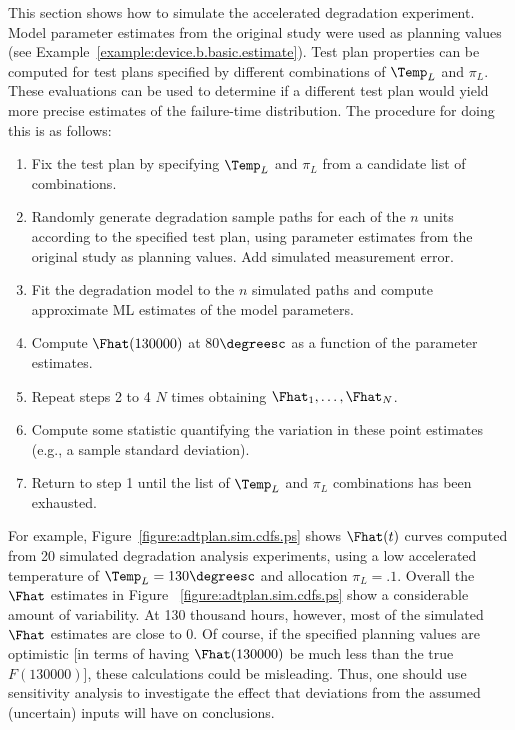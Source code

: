 This section shows how to simulate the accelerated degradation
experiment. Model parameter estimates from the original study were
used as planning values (see
Example~\ref{example:device.b.basic.estimate}). Test plan properties
can be computed for test plans specified by different combinations
of $\Temp_{L}$ and $\pi_{L}$.  These evaluations can be used to
determine if a different test plan would yield more precise
estimates of the failure-time distribution.  The procedure for doing
this is as follows:
%
\begin{enumerate}
\item Fix the test plan by specifying $\Temp_{L}$ and $\pi_{L}$
from a candidate list of combinations.
\item Randomly generate degradation sample paths for each of the $n$
units according to the specified test plan, using parameter estimates from
the original study as planning values. Add simulated measurement error.
\item Fit the degradation model to the $n$ simulated paths and compute
approximate ML estimates of the model parameters. 
\item Compute $\Fhat(130000)$ at 80$\degreesc$ as a function of the
parameter estimates. 
\item Repeat steps 2 to 4 $N$ times obtaining $\Fhat_1, \ldots, \Fhat_N$.
\item Compute some statistic quantifying the variation in these
point estimates (e.g., a sample standard deviation).
\item Return to step 1 until the list of $\Temp_{L}$ and $\pi_{L}$
combinations
has been exhausted.
\end{enumerate}
%
For example, Figure~\ref{figure:adtplan.sim.cdfs.ps} shows 
$\Fhat(t)$ curves computed from 
20 simulated degradation analysis experiments,
using a low accelerated temperature of $\Temp_{L}=130\degreesc$
and allocation $\pi_{L}=.1$. Overall the $\Fhat$ estimates in 
Figure ~\ref{figure:adtplan.sim.cdfs.ps} show a considerable amount of
variability. At 130 thousand hours, however, most of the simulated $\Fhat$
estimates are close to 0. Of course, if the specified planning values
are optimistic [in terms of having $\Fhat(130000)$ be much less than 
the true $F(130000)$], these calculations could be misleading.
Thus, one should use sensitivity analysis to investigate the effect that
deviations from the assumed (uncertain) inputs will have on conclusions.

